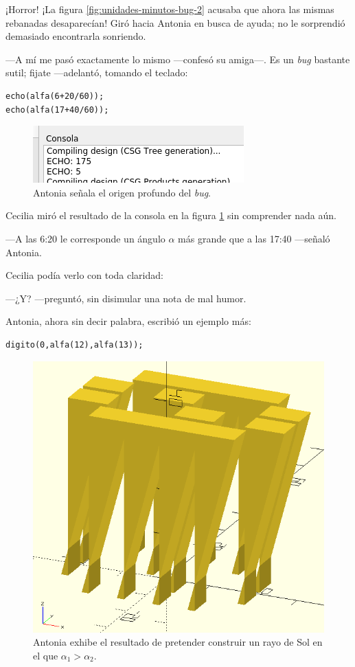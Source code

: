 ¡Horror! ¡La figura \ref{fig:unidades-minutos-bug-2} acusaba que ahora
las mismas rebanadas desaparecían!  Giró hacia Antonia en busca de
ayuda; no le sorprendió demasiado encontrarla sonriendo.

---A mí me pasó exactamente lo mismo ---confesó su a\-mi\-ga---. Es un
\emph{bug} bastante sutil; fijate ---adelantó, tomando el teclado:

\begin{lstlisting}
echo(alfa(6+20/60));
echo(alfa(17+40/60));
\end{lstlisting}


\begin{figure}[ht]
  \centering
  \includegraphics[width=.6\textwidth]{imagenes/unidades-minutos-bug-3}
  \caption{Antonia señala el origen profundo del \emph{bug}.}
  \label{fig:unidades-minutos-bug-3}
\end{figure}


Cecilia miró el resultado de la consola en la figura
\ref{fig:unidades-minutos-bug-3} sin comprender nada aún.

---A las 6:20 le corresponde un ángulo $\alpha$ más grande que a las
17:40 ---señaló Antonia.

Cecilia podía verlo con toda claridad:

---¿Y? ---preguntó, sin disimular una nota de mal humor.

Antonia, ahora sin decir palabra, escribió un ejemplo más:

\begin{lstlisting}[numbers=none]
digito(0,alfa(12),alfa(13));
\end{lstlisting}


\begin{figure}[ht]
  \centering
  \includegraphics[width=.51\textwidth]{imagenes/unidades-minutos-bug-4}
  \caption{Antonia exhibe el resultado de pretender construir un rayo
    de Sol en el que $\alpha_1>\alpha_2$.}
  \label{fig:unidades-minutos-bug-4}
\end{figure}


